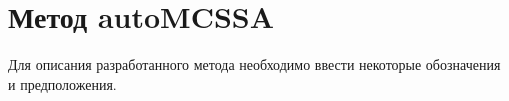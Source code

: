 \documentclass[12pt]{article}
\begin{document}







\section{Метод autoMCSSA}
Для описания разработанного метода необходимо ввести некоторые обозначения и предположения.
\end{document}
